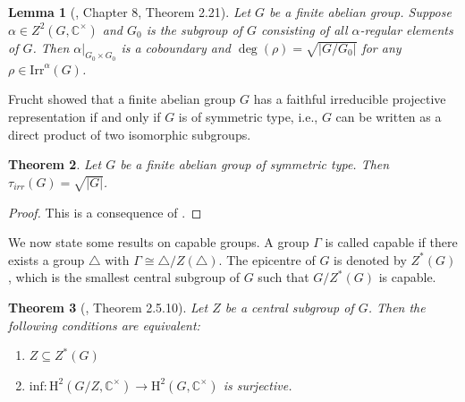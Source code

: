 \documentclass[a4paper,11pt]{amsart}
\numberwithin{equation}{section}
\numberwithin{equation}{subsection}
\newtheorem{theorem}{Theorem}[section]
\newtheorem{lemma}[theorem]{Lemma}
\newcommand{\C}{\mathbb{C}}
\begin{document}

	
	\begin{lemma}[\cite{karpilovsky3}, Chapter 8, Theorem 2.21] \label{properties of abelian groups}
		Let $G$ be a finite abelian group. Suppose $\alpha \in Z^2(G,\mathbb C^\times)$ and $G_0$ is the subgroup of $G$ consisting of all $\alpha$-regular elements of $G$. Then $\alpha|_{G_0 \times G_0}$ is a coboundary and $\operatorname{deg}(\rho) = \sqrt{|G/G_0|}$ for any $\rho \in \mathrm{Irr}^\alpha(G)$.
	\end{lemma}  
	
	Frucht \cite{frucht} showed that a finite abelian group $G$ has a faithful irreducible projective representation if and only if $G$ is of symmetric type, i.e., $G$ can be written as a direct product of two isomorphic subgroups. 
	
	\begin{theorem} \label{projective irreducible embedding degree of finite abelian groups}
		Let $G$ be a finite abelian group of symmetric type. Then $\tau_{irr}(G) = \sqrt{|G|}$.    
	\end{theorem}
	
	\begin{proof}
		This is a consequence of \cite[Chapter 10, Lemma 4.5]{karpilovsky}.     
	\end{proof}
	
	We now state some results on capable groups. A group $\Gamma$ is called capable if there exists a group $\triangle$ with $\Gamma \cong \triangle/Z(\triangle)$. The epicentre of $G$ is denoted by $Z^{*}(G)$, which is the smallest central subgroup of $G$ such that $G/Z^*(G)$ is capable.
	
	\begin{theorem}[\cite{schurmultiplier}, Theorem 2.5.10] \label{epicenter} Let $Z$ be a central subgroup of $G$. Then the following conditions are equivalent:
		\begin{enumerate}
			\item[(a)] $Z \subseteq Z^*(G)$
			\item[(b)] $\mathrm{inf} : \mathrm{H}^2(G/Z,\mathbb{C}^{\times})\rightarrow\mathrm{H}^2(G,\mathbb{C}^{\times})$ is surjective.   
		\end{enumerate}
	\end{theorem}
	
\end{document}
